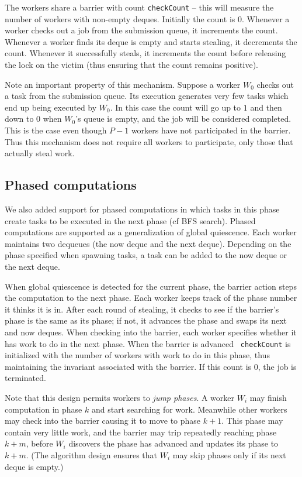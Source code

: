 The workers share a barrier with count {\tt checkCount} -- this will
measure the number of workers with non-empty deques.  Initially the
count is $0$. Whenever a worker checks out a job from the submission
queue, it increments the count. Whenever a worker finds its deque is
empty and starts stealing, it decrements the count. Whenever it
successfully steals, it increments the count before releasing the lock
on the victim (thus ensuring that the count remains positive).

Note an important property of this mechanism. Suppose a worker $W_0$
checks out a task from the submission queue. Its execution generates
very few tasks which end up being executed by $W_0$. In this case the
count will go up to $1$ and then down to $0$ when $W_0$'s queue is
empty, and the job will be considered completed. This is the case even
though $P-1$ workers have not participated in the barrier. Thus this
mechanism does not require all workers to participate, only those that
actually steal work.

\subsection{Phased computations}
We also added support for phased computations in which tasks in this
phase create tasks to be executed in the next phase (cf BFS search).
Phased computations are supported as a generalization of global
quiescence. Each worker maintains two dequeues (the now deque and the
next deque).  Depending on the phase specified when spawning
tasks, a task can be added to the now deque or the next deque.

When global quiescence is detected for the current phase, the barrier
action steps the computation to the next phase. Each worker keeps
track of the phase number it thinks it is in. After each round of
stealing, it checks to see if the barrier's phase is the same as its
phase; if not, it advances the phase and swaps its next and now
deques. When checking into the barrier, each worker specifies whether
it has work to do in the next phase. When the barrier is advanced {\tt
checkCount} is initialized with the number of workers with work to do in this phase, thus maintaining the
invariant associated with the barrier.  If this count is $0$, the job
is terminated.

Note that this design permits workers to {\em jump phases}. A worker
$W_i$ may finish computation in phase $k$ and start searching for
work. Meanwhile other workers may check into the barrier causing it to
move to phase $k+1$. This phase may contain very little work, and the
barrier may trip repeatedly reaching phase $k+m$, before $W_i$
discovers the phase has advanced and updates its phase to $k+m$. (The
algorithm design ensures that $W_i$ may skip phases only if its next
deque is empty.) 


